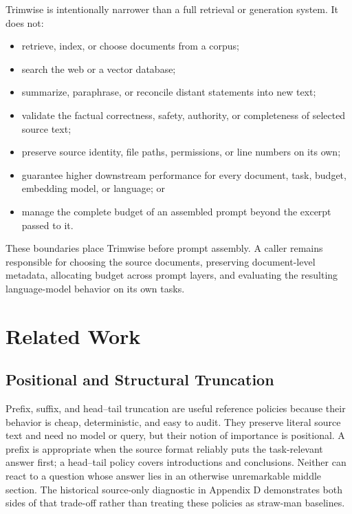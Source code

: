 \documentclass[
]{article}
\providecommand{\tightlist}{%
  \setlength{\itemsep}{0pt}\setlength{\parskip}{0pt}}
\begin{document}
Trimwise is intentionally narrower than a full retrieval or generation
system. It does not:

\begin{itemize}
\tightlist
\item
  retrieve, index, or choose documents from a corpus;
\item
  search the web or a vector database;
\item
  summarize, paraphrase, or reconcile distant statements into new text;
\item
  validate the factual correctness, safety, authority, or completeness
  of selected source text;
\item
  preserve source identity, file paths, permissions, or line numbers on
  its own;
\item
  guarantee higher downstream performance for every document, task,
  budget, embedding model, or language; or
\item
  manage the complete budget of an assembled prompt beyond the excerpt
  passed to it.
\end{itemize}

These boundaries place Trimwise before prompt assembly. A caller remains
responsible for choosing the source documents, preserving document-level
metadata, allocating budget across prompt layers, and evaluating the
resulting language-model behavior on its own tasks.

\section{Related Work}\label{related-work}

\subsection{Positional and Structural
Truncation}\label{positional-and-structural-truncation}

Prefix, suffix, and head--tail truncation are useful reference policies
because their behavior is cheap, deterministic, and easy to audit. They
preserve literal source text and need no model or query, but their
notion of importance is positional. A prefix is appropriate when the
source format reliably puts the task-relevant answer first; a head--tail
policy covers introductions and conclusions. Neither can react to a
question whose answer lies in an otherwise unremarkable middle section.
The historical source-only diagnostic in Appendix D demonstrates both
sides of that trade-off rather than treating these policies as straw-man
baselines.
\end{document}
